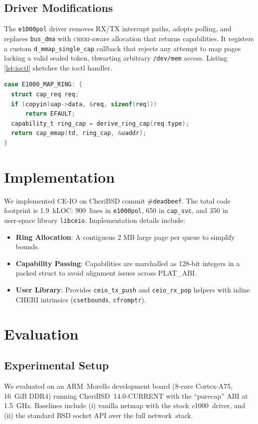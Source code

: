 \documentclass[sigconf]{acmart}
\newcommand{\cheri}{\textsc{cheri}\xspace}
\newcommand{\e}{\textit{e}1000\xspace}
\begin{document}
\subsection{Driver Modifications}
The \texttt{e1000pol} driver removes RX/TX interrupt paths, adopts polling, and replaces \texttt{bus\_dma} with \cheri‑aware allocation that returns capabilities. It registers a custom \texttt{d\_mmap\_single\_cap} callback that rejects any attempt to map pages lacking a valid sealed token, thwarting arbitrary \texttt{/dev/mem} access. Listing\,\ref{lst:ioctl} sketches the ioctl handler.

\begin{lstlisting}[language=C,caption={Capability‑aware ioctl in \texttt{e1000pol}.},label={lst:ioctl}]
case E1000_MAP_RING: {
  struct cap_req req;
  if (copyin(uap->data, &req, sizeof(req)))
      return EFAULT;
  capability_t ring_cap = derive_ring_cap(req.type);
  return cap_mmap(td, ring_cap, &uaddr);
}
\end{lstlisting}

\section{Implementation}
\label{sec:impl}
We implemented CE-IO on CheriBSD commit #\texttt{deadbeef}. The total code footprint is 1.9 kLOC: 900 lines in \texttt{e1000pol}, 650 in \texttt{cap\_svc}, and 350 in user‑space library \texttt{libceio}. Implementation details include:
\begin{itemize}
    \item \textbf{Ring Allocation}: A contiguous 2 MB large page per queue to simplify bounds.
    \item \textbf{Capability Passing}: Capabilities are marshalled as 128‑bit integers in a packed struct to avoid alignment issues across PLAT_ABI.
    \item \textbf{User Library}: Provides \texttt{ceio\_tx\_push} and \texttt{ceio\_rx\_pop} helpers with inline CHERI intrinsics (\texttt{csetbounds}, \texttt{cfromptr}).
\end{itemize}

\section{Evaluation}
\label{sec:eval}
\subsection{Experimental Setup}
We evaluated on an ARM Morello development board (8‑core Cortex‑A75, 16 GiB DDR4) running CheriBSD 14.0‑CURRENT with the “purecap” ABI at \SI{1.5}{\giga\hertz}. Baselines include (i) vanilla netmap with the stock \e driver, and (ii) the standard BSD socket API over the full network stack.
\end{document}
